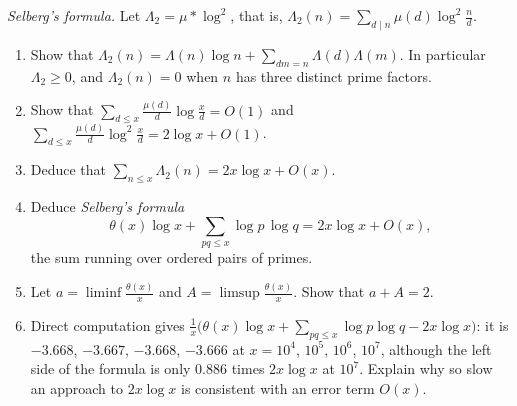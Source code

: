 \begin{exercise}[$\star\star\star$]\label{pb:selberg}
\emph{Selberg's formula.} Let $\Lambda_2=\mu*\log^2$, that is, $\Lambda_2(n)=\sum_{d\mid n}\mu(d)\log^2\frac nd$.
\begin{enumerate}[label=(\alph*)]
\item Show that $\Lambda_2(n)=\Lambda(n)\log n+\sum_{dm=n}\Lambda(d)\Lambda(m)$. In particular $\Lambda_2\ge0$, and $\Lambda_2(n)=0$ when $n$ has three distinct prime
factors.
\item Show that $\sum_{d\le x}\frac{\mu(d)}d\log\frac xd=O(1)$ and $\sum_{d\le x}\frac{\mu(d)}d\log^2\frac xd=2\log x+O(1)$.
\item Deduce that $\sum_{n\le x}\Lambda_2(n)=2x\log x+O(x)$.
\item Deduce \emph{Selberg's formula}
\[
\theta(x)\log x+\sum_{pq\le x}\log p\,\log q=2x\log x+O(x),
\]
the sum running over ordered pairs of primes.
\item Let $a=\liminf\frac{\theta(x)}x$ and $A=\limsup\frac{\theta(x)}x$. Show that $a+A=2$.
\item Direct computation gives $\frac1x\bigl(\theta(x)\log x+\sum_{pq\le x}\log p\log q-2x\log x\bigr)$: it is $-3.668$, $-3.667$, $-3.668$, $-3.666$ at $x=10^4$, $10^5$,
$10^6$, $10^7$, although the left side of the formula is only $0.886$ times $2x\log x$ at $10^7$. Explain why so slow an approach to $2x\log x$ is consistent with an
error term $O(x)$.
\end{enumerate}
\end{exercise}

